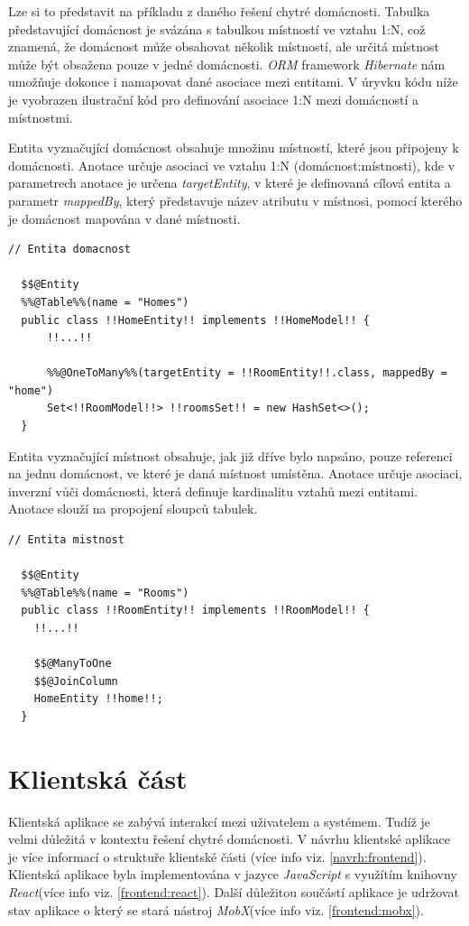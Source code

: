 Lze si to představit na příkladu z daného řešení chytré domácnosti.
Tabulka představující domácnost je svázána s tabulkou místností ve vztahu 1:N, což znamená, že domácnost může obsahovat několik místností, ale určitá místnost může být obsažena pouze v jedné domácnosti.
\emph{ORM} framework \emph{Hibernate} nám umožňuje dokonce i namapovat dané asociace mezi entitami.
V úryvku kódu níže je vyobrazen ilustrační kód pro definování asociace 1:N mezi domácností a místnostmi.

Entita vyznačující domácnost obsahuje množinu místností, které jsou připojeny k domácnosti.
Anotace  určuje asociaci ve vztahu 1:N (domácnost:místnosti), kde v parametrech anotace je určena \emph{targetEntity}, v které je definovaná cílová entita a
parametr \emph{mappedBy}, který představuje název atributu v místnosi, pomocí kterého je domácnost mapována v dané místnosti.

\begin{lstlisting}[style=JavaStyle, caption={Ukázka asociace 1:N (domácnost:místnosti)}]
  // Entita domacnost
  
  $$@Entity
  %%@Table%%(name = "Homes")
  public class !!HomeEntity!! implements !!HomeModel!! {
      !!...!!

      %%@OneToMany%%(targetEntity = !!RoomEntity!!.class, mappedBy = "home")
      Set<!!RoomModel!!> !!roomsSet!! = new HashSet<>();
  }
\end{lstlisting}

Entita vyznačující místnost obsahuje, jak již dříve bylo napsáno, pouze referenci na jednu domácnost, ve které je daná místnost umístěna.
Anotace  určuje asociaci, inverzní vůči domácnosti, která definuje kardinalitu vztahů mezi entitami.
Anotace  slouží na propojení sloupců tabulek.

\begin{lstlisting}[style=JavaStyle,caption={Ukázka asociace 1:N (domácnost:místnosti)}]
  // Entita mistnost
  
  $$@Entity
  %%@Table%%(name = "Rooms")
  public class !!RoomEntity!! implements !!RoomModel!! {
    !!...!!

    $$@ManyToOne
    $$@JoinColumn
    HomeEntity !!home!!;
  }
\end{lstlisting}

\newpage
\section{Klientská část}
\label{impl:frontend}
Klientská aplikace se zabývá interakcí mezi uživatelem a systémem.
Tudíž je velmi důležitá v kontextu řešení chytré domácnosti.
V návrhu klientské aplikace je více informací o struktuře klientské části (více info viz. \ref{navrh:frontend}).
Klientská aplikace byla implementována v jazyce \emph{JavaScript} s využítím knihovny \emph{React}(více info viz. \ref{frontend:react}).
Další důležitou součástí aplikace je udržovat stav aplikace o který se stará nástroj \emph{MobX}(více info viz. \ref{frontend:mobx}).

